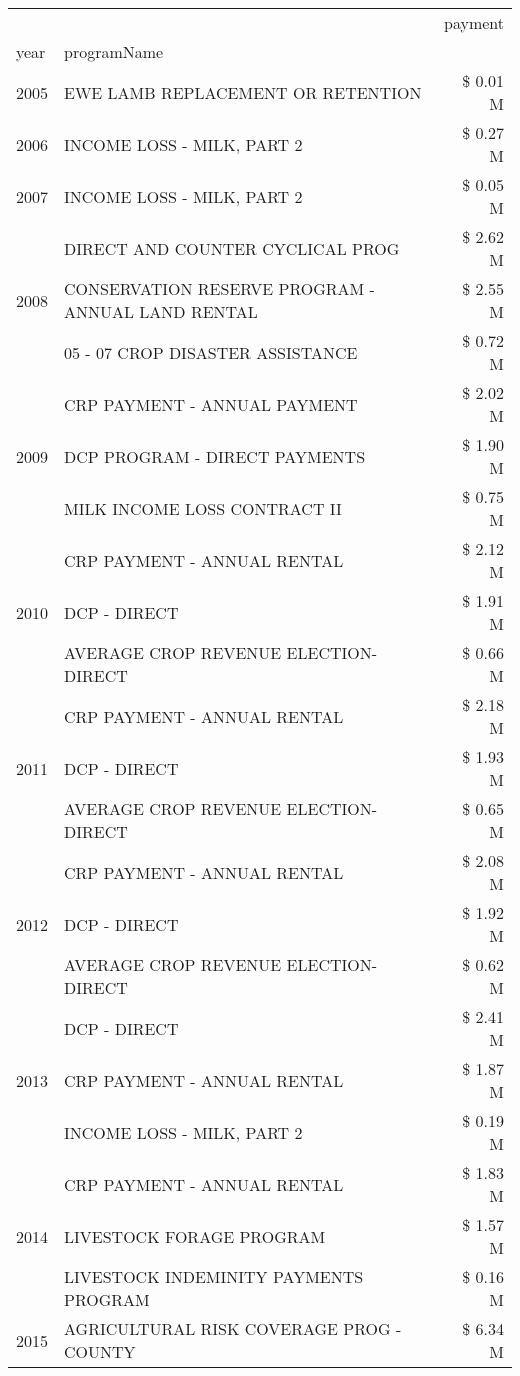 \begin{tabular}{llr}
\toprule
 &  & payment \\
year & programName &  \\
\midrule
2005 & EWE LAMB REPLACEMENT OR RETENTION & \$ 0.01 M \\
\cline{1-3}
2006 & INCOME LOSS - MILK, PART 2 & \$ 0.27 M \\
\cline{1-3}
2007 & INCOME LOSS - MILK, PART 2 & \$ 0.05 M \\
\cline{1-3}
\multirow[t]{3}{*}{2008} & DIRECT AND COUNTER CYCLICAL PROG & \$ 2.62 M \\
 & CONSERVATION RESERVE PROGRAM - ANNUAL LAND RENTAL & \$ 2.55 M \\
 & 05 - 07 CROP DISASTER ASSISTANCE & \$ 0.72 M \\
\cline{1-3}
\multirow[t]{3}{*}{2009} & CRP PAYMENT - ANNUAL PAYMENT & \$ 2.02 M \\
 & DCP PROGRAM - DIRECT PAYMENTS & \$ 1.90 M \\
 & MILK INCOME LOSS CONTRACT II & \$ 0.75 M \\
\cline{1-3}
\multirow[t]{3}{*}{2010} & CRP PAYMENT - ANNUAL RENTAL & \$ 2.12 M \\
 & DCP - DIRECT & \$ 1.91 M \\
 & AVERAGE CROP REVENUE ELECTION-DIRECT & \$ 0.66 M \\
\cline{1-3}
\multirow[t]{3}{*}{2011} & CRP PAYMENT - ANNUAL RENTAL & \$ 2.18 M \\
 & DCP - DIRECT & \$ 1.93 M \\
 & AVERAGE CROP REVENUE ELECTION-DIRECT & \$ 0.65 M \\
\cline{1-3}
\multirow[t]{3}{*}{2012} & CRP PAYMENT - ANNUAL RENTAL & \$ 2.08 M \\
 & DCP - DIRECT & \$ 1.92 M \\
 & AVERAGE CROP REVENUE ELECTION-DIRECT & \$ 0.62 M \\
\cline{1-3}
\multirow[t]{3}{*}{2013} & DCP - DIRECT & \$ 2.41 M \\
 & CRP PAYMENT - ANNUAL RENTAL & \$ 1.87 M \\
 & INCOME LOSS - MILK, PART 2 & \$ 0.19 M \\
\cline{1-3}
\multirow[t]{3}{*}{2014} & CRP PAYMENT - ANNUAL RENTAL & \$ 1.83 M \\
 & LIVESTOCK FORAGE PROGRAM & \$ 1.57 M \\
 & LIVESTOCK INDEMINITY PAYMENTS PROGRAM & \$ 0.16 M \\
\cline{1-3}
\multirow[t]{3}{*}{2015} & AGRICULTURAL RISK COVERAGE PROG - COUNTY & \$ 6.34 M \\

\end{tabular}
